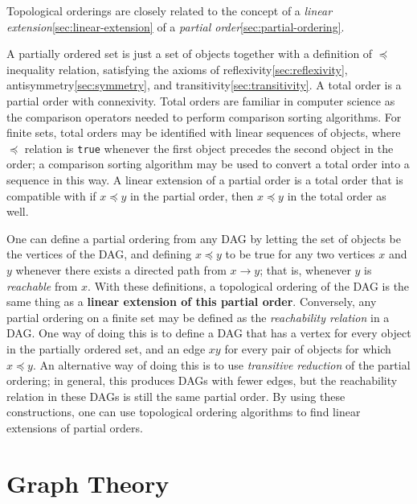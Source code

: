 Topological orderings are closely related to the concept of a
\textit{linear extension}\ref{sec:linear-extension} of a
\textit{partial order}\ref{sec:partial-ordering}.

A partially ordered set is just a set of objects together with a
definition of $\preceq$ inequality relation, satisfying the axioms of
reflexivity\ref{sec:reflexivity}, antisymmetry\ref{sec:symmetry}, and
transitivity\ref{sec:transitivity}. A total order is a partial order
with connexivity. Total orders are familiar in computer science as the
comparison operators needed to perform comparison sorting
algorithms. For finite sets, total orders may be identified with
linear sequences of objects, where $\preceq$ relation is \texttt{true}
whenever the first object precedes the second object in the order; a
comparison sorting algorithm may be used to convert a total order into
a sequence in this way. A linear extension of a partial order is a
total order that is compatible with if $x \preceq y$ in the partial
order, then $x \preceq y$ in the total order as well.


One can define a partial ordering from any DAG by letting the set of
objects be the vertices of the DAG, and defining $x \preceq y$ to be
true for any two vertices $x$ and $y$ whenever there exists a directed
path from $x \to y$; that is, whenever $y$ is \textit{reachable} from
$x$. With these definitions, a topological ordering of the DAG is the
same thing as a \textbf{linear extension of this partial
  order}. Conversely, any partial ordering on a finite set may be
defined as the \textit{reachability relation} in a DAG. One way of
doing this is to define a DAG that has a vertex for every object in
the partially ordered set, and an edge $xy$ for every pair of objects
for which $x \preceq y$. An alternative way of doing this is to use
\textit{transitive reduction} of the partial ordering; in general,
this produces DAGs with fewer edges, but the reachability relation in
these DAGs is still the same partial order. By using these
constructions, one can use topological ordering algorithms to find
linear extensions of partial orders.


\newpage

\section{Graph Theory}
\label{sec:graph-theory}

